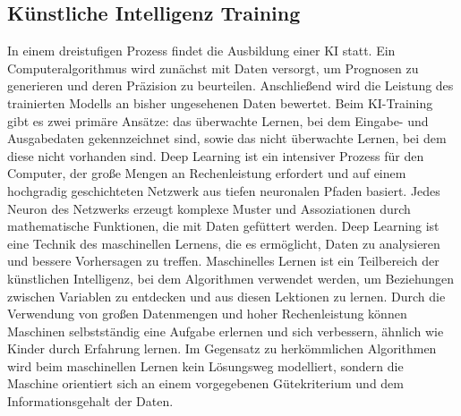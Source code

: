 \subsection{Künstliche Intelligenz Training}

In einem dreistufigen Prozess findet die Ausbildung einer KI statt.
Ein Computeralgorithmus wird zunächst mit Daten versorgt, um Prognosen zu generieren und deren Präzision zu beurteilen.
Anschließend wird die Leistung des trainierten Modells an bisher ungesehenen Daten bewertet.
Beim KI-Training gibt es zwei primäre Ansätze: das überwachte Lernen, bei dem Eingabe- und Ausgabedaten gekennzeichnet sind, sowie das nicht überwachte Lernen, bei dem diese nicht vorhanden sind.
\newline
Deep Learning ist ein intensiver Prozess für den Computer, der große Mengen an Rechenleistung erfordert und auf einem hochgradig geschichteten Netzwerk aus tiefen neuronalen Pfaden basiert. Jedes Neuron des Netzwerks erzeugt komplexe Muster und Assoziationen durch mathematische Funktionen, die mit Daten gefüttert werden. Deep Learning ist eine Technik des maschinellen Lernens, die es ermöglicht, Daten zu analysieren und bessere Vorhersagen zu treffen. \citep{ai-training-cw}
\newline
Maschinelles Lernen ist ein Teilbereich der künstlichen Intelligenz, bei dem Algorithmen verwendet werden, um Beziehungen zwischen Variablen zu entdecken und aus diesen Lektionen zu lernen. Durch die Verwendung von großen Datenmengen und hoher Rechenleistung können Maschinen selbstständig eine Aufgabe erlernen und sich verbessern, ähnlich wie Kinder durch Erfahrung lernen. Im Gegensatz zu herkömmlichen Algorithmen wird beim maschinellen Lernen kein Lösungsweg modelliert, sondern die Maschine orientiert sich an einem vorgegebenen Gütekriterium und dem Informationsgehalt der Daten.